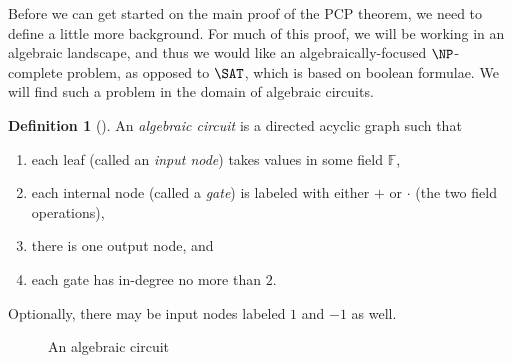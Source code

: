 \documentclass[english,12pt]{reedthesis}
\theoremstyle{plain}
\theoremstyle{definition}
\newtheorem{defn}[defn]{Definition}
\theoremstyle{remark}
\begin{document}
Before we can get started on the main proof of the PCP theorem, we need to
define a little more background. For much of this proof, we will be working in
an algebraic landscape, and thus we would like an algebraically-focused
$\NP$-complete problem, as opposed to $\SAT$, which is based on boolean
formulae. We will find such a problem in the domain of algebraic circuits.

\begin{defn}[{\cite[]{AB09}}]\label{def:alg-circuit}
  An \emph{algebraic circuit} is a directed acyclic graph such that
  \begin{enumerate}
    \item each leaf (called an \emph{input node}) takes values in some field
          $\mathbb{F}$,
    \item each internal node (called a \emph{gate}) is labeled with either $+$
          or $\cdot$ (the two field operations),
    \item there is one output node, and
    \item each gate has in-degree no more than $2$.
  \end{enumerate}
  Optionally, there may be input nodes labeled $1$ and $-1$ as well.
\end{defn}

\begin{figure}
  \begin{center}
  \end{center}
  \caption{An algebraic circuit}\label{fig:algebraic-circuit}
\end{figure}
\end{document}
